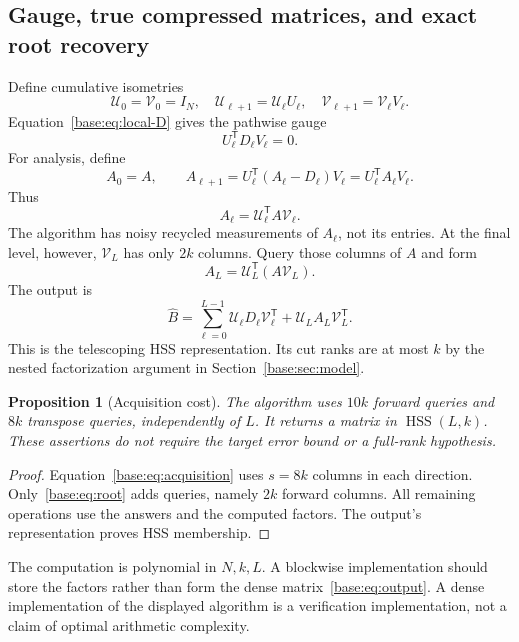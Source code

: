 \documentclass[11pt,oneside,openany,a4paper]{book}
\numberwithin{equation}{chapter}
\newtheorem{proposition}[theorem]{Proposition}
\theoremstyle{definition}
\theoremstyle{remark}
\newcommand{\T}{\mathsf T}\newcommand{\Id}{I}
\DeclareMathOperator{\HSS}{HSS}\DeclareMathOperator{\dist}{dist}
\newcommand{\UC}{\mathcal U}\newcommand{\VC}{\mathcal V}\newcommand{\err}{\mathcal E}
\begin{document}
\subsection{Gauge, true compressed matrices, and exact root recovery}
Define cumulative isometries
\begin{equation}\label{base:eq:cumulative}
 \UC_0=\VC_0=I_N,\quad
 \UC_{\ell+1}=\UC_\ell U_\ell,\quad
 \VC_{\ell+1}=\VC_\ell V_\ell.
\end{equation}
Equation~\eqref{base:eq:local-D} gives the pathwise gauge
\begin{equation}\label{base:eq:gauge}
 U_\ell^{\T} D_\ell V_\ell=0.
\end{equation}
For analysis, define
\begin{equation}\label{base:eq:true-compress}
 A_0=A,\qquad
 A_{\ell+1}=U_\ell^{\T}(A_\ell-D_\ell)V_\ell
            =U_\ell^{\T} A_\ell V_\ell.
\end{equation}
Thus
\begin{equation}\label{base:eq:actual-core}
 A_\ell=\UC_\ell^{\T} A\VC_\ell.
\end{equation}
The algorithm has noisy recycled measurements of $A_\ell$, not its entries.
At the final level, however, $\VC_L$ has only $2k$ columns. Query those
columns of $A$ and form
\begin{equation}\label{base:eq:root}
 A_L=\UC_L^{\T}(A\VC_L).
\end{equation}
The output is
\begin{equation}\label{base:eq:output}
 \widehat B=
 \sum_{\ell=0}^{L-1}\UC_\ell D_\ell\VC_\ell^{\T}
 +\UC_L A_L\VC_L^{\T}.
\end{equation}
This is the telescoping HSS representation. Its cut ranks are at most $k$
by the nested factorization argument in Section~\ref{base:sec:model}.

\begin{proposition}[Acquisition cost]\label{base:prop:queries}
The algorithm uses $10k$ forward queries and $8k$ transpose queries,
independently of $L$. It returns a matrix in $\HSS(L,k)$. These assertions
do not require the target error bound or a full-rank hypothesis.
\end{proposition}
\begin{proof}
Equation~\eqref{base:eq:acquisition} uses $s=8k$ columns in each direction.
Only~\eqref{base:eq:root} adds queries, namely $2k$ forward columns. All remaining
operations use the answers and the computed factors. The output's
representation proves HSS membership.\end{proof}
The computation is polynomial in $N,k,L$. A blockwise implementation should
store the factors rather than form the dense matrix~\eqref{base:eq:output}.
A dense implementation of the displayed algorithm is a verification implementation, not a claim
of optimal arithmetic complexity.
\end{document}
